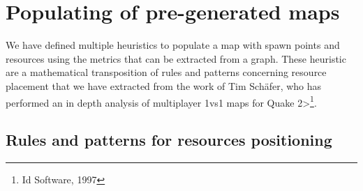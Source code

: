 
\section{Populating of pre-generated maps}

We have defined multiple heuristics to populate a map with spawn points and resources using the metrics that can be extracted from a graph. These heuristic are a mathematical transposition of rules and patterns concerning resource placement that we have extracted from the work of Tim Schäfer\cite{great1vs1}, who has performed an in depth analysis of multiplayer 1vs1 maps for \<Quake 2>\footnote{Id Software, 1997}.

\subsection{Rules and patterns for resources positioning}

